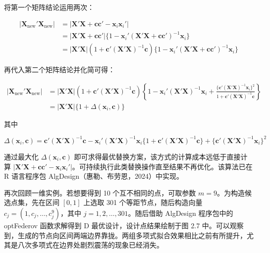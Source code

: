 \documentclass{ctexart}
\begin{document}
将第一个矩阵结论运用两次：

\begin{align*}
|\boldsymbol{X}_{\mathrm{new}}'\boldsymbol{X}_{\mathrm{new}}|&=|\boldsymbol{X}'\boldsymbol{X}+\boldsymbol{c}\boldsymbol{c}'-\boldsymbol{x}_{i}\boldsymbol{x}_{i}'|\\
&=|\boldsymbol{X}'\boldsymbol{X}+\boldsymbol{c}\boldsymbol{c}'|\{1-\boldsymbol{x}_{i}'(\boldsymbol{X}'\boldsymbol{X}+\boldsymbol{c}\boldsymbol{c}')^{-1}\boldsymbol{x}_{i}\}\\
&=|\boldsymbol{X}'\boldsymbol{X}|(1+\boldsymbol{c}'(\boldsymbol{X}'\boldsymbol{X})^{-1}\boldsymbol{c})\{1-\boldsymbol{x}_{i}'(\boldsymbol{X}'\boldsymbol{X}+\boldsymbol{c}\boldsymbol{c}')^{-1}\boldsymbol{x}_{i}\}
\end{align*}

再代入第二个矩阵结论并化简可得：

\begin{align*}
|\boldsymbol{X}_{\mathrm{new}}'\boldsymbol{X}_{\mathrm{new}}|&=|\boldsymbol{X}'\boldsymbol{X}|(1+\boldsymbol{c}'(\boldsymbol{X}'\boldsymbol{X})^{-1}\boldsymbol{c})\left\{1-\boldsymbol{x}_{i}'(\boldsymbol{X}'\boldsymbol{X})^{-1}\boldsymbol{x}_{i}+\frac{\{\boldsymbol{c}'(\boldsymbol{X}'\boldsymbol{X})^{-1}\boldsymbol{x}_{i}\}^{2}}{1+\boldsymbol{c}'(\boldsymbol{X}'\boldsymbol{X})^{-1}\boldsymbol{c}}\right\}\\
&=|\boldsymbol{X}'\boldsymbol{X}|\{1+\Delta(\boldsymbol{x}_{i},\boldsymbol{c})\}
\end{align*}

其中

\begin{equation*}
\Delta(\boldsymbol{x}_{i},\boldsymbol{c})=\boldsymbol{c}'(\boldsymbol{X}'\boldsymbol{X})^{-1}\boldsymbol{c}-\boldsymbol{x}_{i}'(\boldsymbol{X}'\boldsymbol{X})^{-1}\boldsymbol{x}_{i}\{1+\boldsymbol{c}'(\boldsymbol{X}'\boldsymbol{X})^{-1}\boldsymbol{c}\}+\{\boldsymbol{c}'(\boldsymbol{X}'\boldsymbol{X})^{-1}\boldsymbol{x}_{i}\}^{2}
\end{equation*}

通过最大化 $\Delta(\boldsymbol{x}_i,\boldsymbol{c})$ 即可求得最优替换方案，该方式的计算成本远低于直接计算 $|\boldsymbol{X}'\boldsymbol{X}+\boldsymbol{c}\boldsymbol{c}'-\boldsymbol{x}_i\boldsymbol{x}_i'|$。可持续执行此类替换操作直至结果不再优化。该算法已在 R 语言程序包 AlgDesign（惠勒、布劳恩，2024）中实现。

再次回顾一维实例。若想要得到 10 个互不相同的点，可取参数 $m=9$。为构造候选点集，先在区间 $[0,1]$ 上选取 301 个等距节点，随后构造向量 $c_j=(1,c_j,\dots,c_j^9)$，其中 $j=1,2,\dots,301$。随后借助 AlgDesign 程序包中的 optFederov 函数求解得到 D 最优设计，设计点结果绘制于图 2.7 中。可以观察到，生成的节点向区间两端边界靠拢。两组多项式拟合效果相比之前有所提升，尤其是八次多项式在边界处剧烈震荡的现象已经消失。
\end{document}
